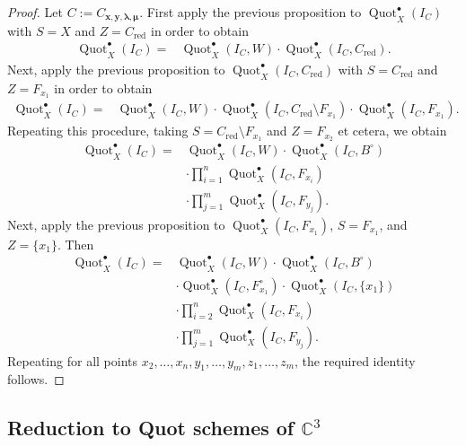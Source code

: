 \documentclass[12pt]{amsart}
\theoremstyle{definition}
\newcommand{\CC} {\mathbb{C}}          %
\newcommand{\Quot}{\operatorname{Quot}}
\newcommand{\boldx}{\boldsymbol{x}}
\newcommand{\boldy}{\boldsymbol{y}}
\newcommand{\boldlambda}{\boldsymbol{\lambda }}
\newcommand{\boldmu}{\boldsymbol{\mu }}
\newcommand{\red}{\mathrm{red}}
\newcommand{\SubSecSpace}{$\,$\vspace{0.2cm}\par } %
\begin{document}
\begin{proof}
Let $C:= C_{\boldx, \boldy, \boldlambda, \boldmu}$. First apply the previous proposition to $\Quot_X^{\bullet}(I_C)$ 
with $S = X$ and $Z = C_{\red}$ in order to obtain
\begin{align*}
\Quot_X^{\bullet}(I_C)  =&\Quot_X^{\bullet}(I_C,W) \cdot 
\Quot_X^{\bullet}(I_C,C_{\red}).
\end{align*}
Next, apply the previous proposition to $\Quot_X^{\bullet}(I_C,C_{\red})$ 
with $S = C_{\red}$ and $Z = F_{x_1}$ in order to obtain
\begin{align*}
\Quot_X^{\bullet}(I_C)  =&\Quot_X^{\bullet}(I_C,W) \cdot 
\Quot_X^{\bullet}(I_C,C_{\red} \setminus F_{x_1}) \cdot \Quot_X^{\bullet}(I_C,F_{x_1}).
\end{align*}
Repeating this procedure, taking $S = C_{\red} \setminus F_{x_1}$ and 
$Z = F_{x_2}$ et cetera, we obtain
\begin{align*}
\Quot_X^{\bullet}(I_C) =&\Quot_X^{\bullet}(I_C,W) \cdot
\Quot_X^{\bullet}(I_C,B^\circ) \\
&\cdot \prod_{i=1}^{n}
\Quot_X^{\bullet}(I_C,F_{x_i}) \\
&\cdot \prod_{j=1}^{m}
\Quot_X^{\bullet}(I_C,F_{y_j}).
\end{align*}
Next, apply the previous proposition to $\Quot_X^{\bullet}(I_C,F_{x_1})$, 
$S = F_{x_1}$, and $Z = \{x_1\}$. Then
\begin{align*}
\Quot_X^{\bullet}(I_C) =&\Quot_X^{\bullet}(I_C,W) \cdot
\Quot_X^{\bullet}(I_C,B^\circ) \\
&\cdot \Quot_X^\bullet(I_C,F_{x_1}^\circ) \cdot \Quot_X^\bullet(I_C,\{x_1\}) \\
&\cdot \prod_{i=2}^{n}
\Quot_X^{\bullet}(I_C,F_{x_i}) \\
&\cdot \prod_{j=1}^{m}
\Quot_X^{\bullet}(I_C,F_{y_j}).
\end{align*}
Repeating for all points $x_2, \ldots, x_n, y_1, \ldots, y_m, z_1, \ldots, z_m$, 
the required identity follows.
\end{proof}


\subsection{Reduction to Quot schemes of $\CC^3$}\label{subsec: Formal coordinates and
reduction to Hilbert scheme on C3}\SubSecSpace
\end{document}
